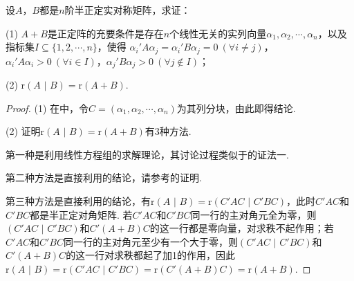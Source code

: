 \documentclass[../../main.tex]{subfiles}%
\begin{document}
\begin{proposition}\label{proposition:两个半正定阵可同时合同对角化3}
设\(A\)，\(B\)都是\(n\)阶半正定实对称矩阵，求证：

(1) \(A + B\)是正定阵的充要条件是存在\(n\)个线性无关的实列向量\(\alpha_1,\alpha_2,\cdots,\alpha_n\)，以及指标集\(I\subseteq\{1,2,\cdots,n\}\)，使得
\(\alpha_i'A\alpha_j=\alpha_i'B\alpha_j = 0\ (\forall i\neq j)\)，\(\alpha_i'A\alpha_i>0\ (\forall i\in I)\)，\(\alpha_j'B\alpha_j>0\ (\forall j\notin I)\)；

(2) \(\mathrm{r}(A\,\,|\,\, B)=\mathrm{r}(A + B)\).
\end{proposition}
\begin{proof}
(1) 在中，令\(C = (\alpha_1,\alpha_2,\cdots,\alpha_n)\)为其列分块，由此即得结论.

(2) 证明\(\mathrm{r}(A\,\,|\,\, B)=\mathrm{r}(A + B)\)有3种方法. 

第一种是利用线性方程组的求解理论，其讨论过程类似于的证法一. 

第二种方法是直接利用的结论，请参考的证明. 

第三种方法是直接利用的结论，有\(\mathrm{r}(A\,\,|\,\, B)=\mathrm{r}(C'AC\,\,|\,\, C'BC)\)，此时\(C'AC\)和\(C'BC\)都是半正定对角矩阵. 若\(C'AC\)和\(C'BC\)同一行的主对角元全为零，则\((C'AC\,\,|\,\, C'BC)\)和\(C'(A + B)C\)的这一行都是零向量，对求秩不起作用；若\(C'AC\)和\(C'BC\)同一行的主对角元至少有一个大于零，则\((C'AC\,\,|\,\, C'BC)\)和\(C'(A + B)C\)的这一行对求秩都起了加1的作用，因此\(\mathrm{r}(A\,\,|\,\, B)=\mathrm{r}(C'AC\,\,|\,\, C'BC)=\mathrm{r}(C'(A + B)C)=\mathrm{r}(A + B)\).
\end{proof}
\end{document}
